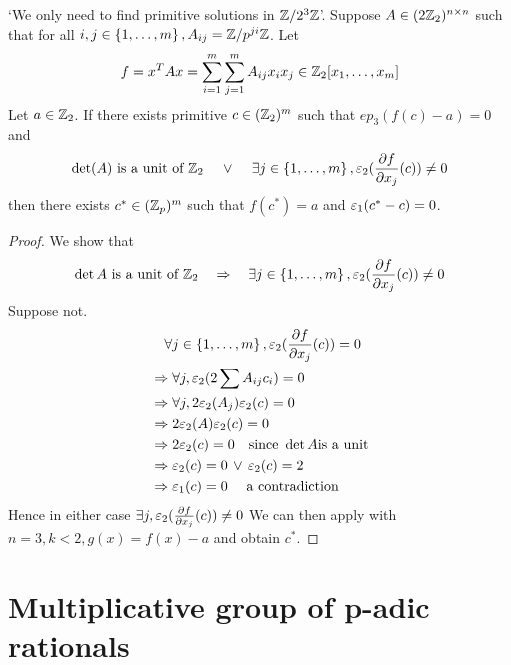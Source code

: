 \begin{cor}
    `We only need to find primitive solutions in $\zmo[2]{3}$'.
    Suppose $A \in (2 \Z_2)^{n \times n}$
    such that for all 
    $i,j \in \set{1,\dots,m}, A_{ij} = \zmo{ji}$. 
    Let
    \[
        f = x^T A x = 
        \sum_{i = 1}^m \sum_{j = 1}^m A_{ij} x_i x_j
        \in \Z_2[x_1,\dots,x_m]
    \]
    Let $a \in \Z_2$.
    If there exists primitive $c \in (\Z_2)^m$
    such that $ep_3(f(c) - a) = 0$ and
    \[\det(A) \text{ is a unit of } \Z_2 \quad \OR \quad 
    \exists j \in \set{1,\dots,m}, \ep_2(\del{f}{x_j}(c)) \ne 0\]
    then there exists $c^* \in (\Z_p)^m$
    such that $f(c^*) = a$ and $\ep_1(c^* - c) = 0$.   
\end{cor}
\begin{proof}
    We show that 
    \[\det A \text{ is a unit of } \Z_2 \quad \implies \quad 
    \exists j \in \set{1,\dots,m}, \ep_2(\del{f}{x_j}(c)) \ne 0\]
    Suppose not.
    \begin{align*}
        &\quad \forall j \in \set{1,\dots,m}, \ep_2(\del{f}{x_j}(c)) = 0\\
        &\implies \forall j, \ep_2(2 \sum A_{ij} c_i) = 0\\
        &\implies \forall j, 2 \ep_2(A_j)\ep_2(c) = 0\\
        &\implies 2 \ep_2(A)\ep_2(c) = 0\\
        &\implies 2 \ep_2(c) = 0 \quad \text{since } 
        \det A \text{is a unit}\\
        &\implies \ep_2(c) = 0 \OR \ep_2(c) = 2\\
        &\implies \ep_1(c) = 0 \quad \text{ a contradiction}
    \end{align*}
    Hence in either case $\exists j, \ep_2(\del{f}{x_j}(c)) \ne 0$
    We can then apply  
    with $n = 3, k < 2, g(x) = f(x) - a$ and obtain $c^*$.
\end{proof}

\section{Multiplicative group of p-adic rationals}

